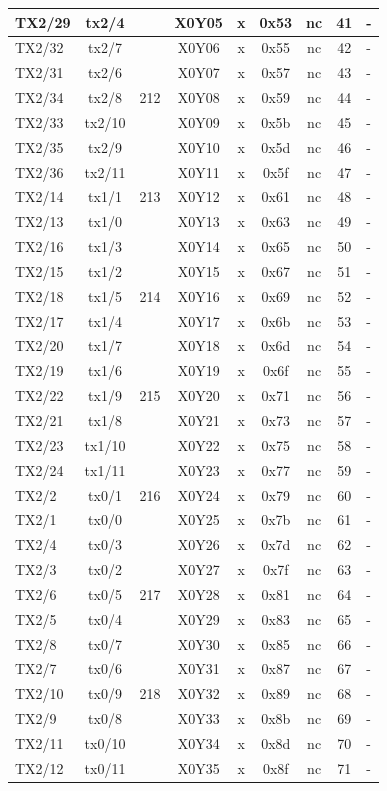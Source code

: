 \begin{longtable}{|l|c|c|c|c|c|c|c|l|}
TX2/29 & tx2/4  &     & X0Y05 &  x  & 0x53 & nc & 41 & -\\\hline
TX2/32 & tx2/7  &     & X0Y06 &  x  & 0x55 & nc & 42 & -\\\hline
TX2/31 & tx2/6  &     & X0Y07 &  x  & 0x57 & nc & 43 & -\\\hline
TX2/34 & tx2/8  & 212 & X0Y08 &  x  & 0x59 & nc & 44 & -\\\hline
TX2/33 & tx2/10 &     & X0Y09 &  x  & 0x5b & nc & 45 & -\\\hline
TX2/35 & tx2/9  &     & X0Y10 &  x  & 0x5d & nc & 46 & -\\\hline
TX2/36 & tx2/11 &     & X0Y11 &  x  & 0x5f & nc & 47 & -\\\hline
TX2/14 & tx1/1  & 213 & X0Y12 &  x  & 0x61 & nc & 48 & -\\\hline
TX2/13 & tx1/0  &     & X0Y13 &  x  & 0x63 & nc & 49 & -\\\hline
TX2/16 & tx1/3  &     & X0Y14 &  x  & 0x65 & nc & 50 & -\\\hline
TX2/15 & tx1/2  &     & X0Y15 &  x  & 0x67 & nc & 51 & -\\\hline
TX2/18 & tx1/5  & 214 & X0Y16 &  x  & 0x69 & nc & 52 & -\\\hline
TX2/17 & tx1/4  &     & X0Y17 &  x  & 0x6b & nc & 53 & -\\\hline
TX2/20 & tx1/7  &     & X0Y18 &  x  & 0x6d & nc & 54 & -\\\hline
TX2/19 & tx1/6  &     & X0Y19 &  x  & 0x6f & nc & 55 & -\\\hline
TX2/22 & tx1/9  & 215 & X0Y20 &  x  & 0x71 & nc & 56 & -\\\hline
TX2/21 & tx1/8  &     & X0Y21 &  x  & 0x73 & nc & 57 & -\\\hline
TX2/23 & tx1/10 &     & X0Y22 &  x  & 0x75 & nc & 58 & -\\\hline
TX2/24 & tx1/11 &     & X0Y23 &  x  & 0x77 & nc & 59 & -\\\hline
TX2/2  & tx0/1  & 216 & X0Y24 &  x  & 0x79 & nc & 60 & -\\\hline
TX2/1  & tx0/0  &     & X0Y25 &  x  & 0x7b & nc & 61 & -\\\hline
TX2/4  & tx0/3  &     & X0Y26 &  x  & 0x7d & nc & 62 & -\\\hline
TX2/3  & tx0/2  &     & X0Y27 &  x  & 0x7f & nc & 63 & -\\\hline
TX2/6  & tx0/5  & 217 & X0Y28 &  x  & 0x81 & nc & 64 & -\\\hline
TX2/5  & tx0/4  &     & X0Y29 &  x  & 0x83 & nc & 65 & -\\\hline
TX2/8  & tx0/7  &     & X0Y30 &  x  & 0x85 & nc & 66 & -\\\hline
TX2/7  & tx0/6  &     & X0Y31 &  x  & 0x87 & nc & 67 & -\\\hline
TX2/10 & tx0/9  & 218 & X0Y32 &  x  & 0x89 & nc & 68 & -\\\hline
TX2/9  & tx0/8  &     & X0Y33 &  x  & 0x8b & nc & 69 & -\\\hline
TX2/11 & tx0/10 &     & X0Y34 &  x  & 0x8d & nc & 70 & -\\\hline
TX2/12 & tx0/11 &     & X0Y35 &  x  & 0x8f & nc & 71 & -\\\hline


\end{longtable}

